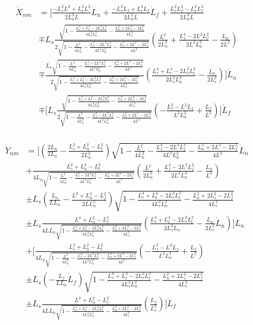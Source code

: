 \documentclass[11pt, landscape]{article}
\begin{document}
\begin{align}
  \dot{X}_{nm} &= \Bigg[\frac{-L_s^2L^2 + L_t^2L^2}{2L_n^3L}\dot{L}_n + \frac{-L_s^2L_{f} + L_t^2L_{f}}{2L_n^2L}\dot{L}_f + \frac{L_s^2L_{f}^2 - L_t^2L_{f}^2}{2L_n^3L}\\
  &\mp L_s\frac{\sqrt{1 - \frac{L_s^4 + L_t^4 - 2L_s^2L_t^2}{4L_{s}^2L_{n}^2} - \frac{L_n^2 + 2L_s^2 - 2L_t^2}{4L_s^2}}}{2\sqrt{1 - \frac{L^2}{4L_n^2} - \frac{L_f^4 - 2L^2L_f^2}{4L^2L_n^2} - \frac{L_n^2 + 2L^2 - 2L_f^2}{4L^2}}}\left(\frac{L^2}{2L_n^3} + \frac{L_f^4 - 2L^2L_f^2}{2L^2L_n^3} - \frac{L_n}{2L^2}\right)\\
  &\mp \frac{L_s\sqrt{1 - \frac{L^2}{4L_n^2} - \frac{L_f^4 - 2L^2L_f^2}{4L^2L_n^2} - \frac{L_n^2 + 2L^2 - 2L_f^2}{4L^2}}}{2\sqrt{1 - \frac{L_s^4 + L_t^4 - 2L_s^2L_t^2}{4L_{s}^2L_{n}^2} - \frac{L_n^2 + 2L_s^2 - 2L_t^2}{4L_s^2}}}
  \left(\frac{L_s^4 + L_t^4 - 2L_s^2L_t^2}{2L_{s}^2L_{n}^3} - \frac{L_n}{2L_s^2}\right)\Bigg]\dot{L}_n\\
  &\mp \Bigg[L_s\frac{\sqrt{1 - \frac{L_s^4 + L_t^4 - 2L_s^2L_t^2}{4L_{s}^2L_{n}^2} - \frac{L_n^2 + 2L_s^2 - 2L_t^2}{4L_s^2}}}{2\sqrt{1 - \frac{L^2}{4L_n^2} - \frac{L_f^4 - 2L^2L_f^2}{4L^2L_n^2} - \frac{L_n^2 + 2L^2 - 2L_f^2}{4L^2}}}\left(-\frac{L_f^3 - L^2L_f}{L^2L_n^2} + \frac{L_f}{L^2}\right)\Bigg]\dot{L}_f\\
\end{align}

\begin{align}
  \dot{Y}_{nm} &= \bigg[\left(\frac{2L_n}{2L_n} - \frac{L_{s}^2+L_{n}^2-L_{t}^2}{2L_n^2}\right)\sqrt{1 - \frac{L^2}{4L_{n}^2} - \frac{L_f^4 - 2L^2L_f^2}{4L^2L^2_{n}} - \frac{L_n^2 + 2L^2 - 2L_f^2}{4L^2}}\dot{L}_n\\
    &+ \frac{L_{s}^2+L_{n}^2-L_{t}^2}{4L_{n}\sqrt{1 - \frac{L^2}{4L_{n}^2} - \frac{L_f^4 - 2L^2L_f^2}{4L^2L^2_{n}} - \frac{L_n^2 + 2L^2 - 2L_f^2}{4L^2}}}\left(\frac{L^2}{2L_n^3} + \frac{L_f^4 - 2L^2L_f^2}{2L^2L^3_n} - \frac{L_n}{L^2}\right)\\
    &\pm L_s\left(\frac{L_n}{LL_{n}} - \frac{L^2+L_{n}^2-L_{f}^2}{2LL_n^2}\right)\sqrt{1 - \frac{L_s^4 + L_t^4 - 2L_s^2L_t^2}{4L_s^2L_n^2} - \frac{L_n^2 + 2L_s^2 - 2L_f^2}{4L_s^2}}\\
    &\pm L_s\frac{L^2+L_{n}^2-L_{f}^2}{4LL_{n}\sqrt{1 - \frac{L_s^4 + L_t^4 - 2L_s^2L_t^2}{4L_s^2L_n^2} - \frac{L_n^2 + 2L_s^2 - 2L_f^2}{4L_s^2}}}\left(\frac{L_s^4 + L_t^4 - 2L_s^2L_t^2}{2L_s^2L_n} - \frac{L_n}{2L_s^2}\dot{L}_n\right)
  \bigg]\dot{L}_n\\
  &+\bigg[\frac{L_{s}^2+L_{n}^2-L_{t}^2}{4L_{n}\sqrt{1 - \frac{L^2}{4L_{n}^2} - \frac{L_f^4 - 2L^2L_f^2}{4L^2L^2_{n}} - \frac{L_n^2 + 2L^2 - 2L_f^2}{4L^2}}}\left(-\frac{L_f^3 - L^2L_f}{L^2L^2_{n}} + \frac{L_f}{L^2}\right)\\
    &\pm L_s\left(-\frac{L_f}{LL_{n}}\dot{L}_f\right)\sqrt{1 - \frac{L_s^4 + L_t^4 - 2L_s^2L_t^2}{4L_s^2L_n^2} - \frac{L_n^2 + 2L_s^2 - 2L_f^2}{4L_s^2}}\\
    &\pm L_s\frac{L^2+L_{n}^2-L_{f}^2}{4LL_{n}\sqrt{1 - \frac{L_s^4 + L_t^4 - 2L_s^2L_t^2}{4L_s^2L_n^2} - \frac{L_n^2 + 2L_s^2 - 2L_f^2}{4L_s^2}}}\left(\frac{L_f}{L_s^2}\right)
  \bigg]\dot{L}_f
\end{align}
\end{document}
